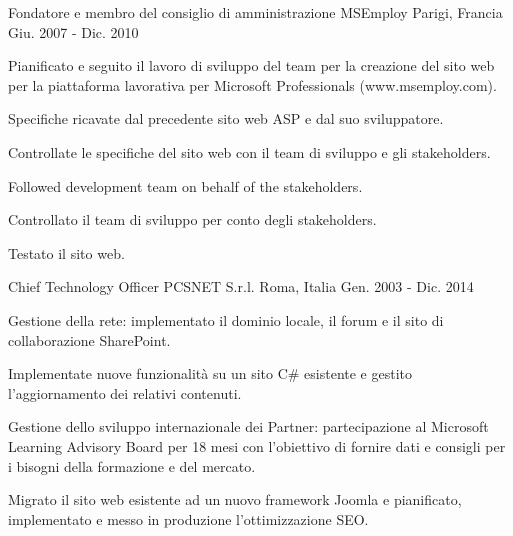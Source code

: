 \begin{cventries}
  \cventry
    {Fondatore e membro del consiglio di amministrazione} %
    {MSEmploy} %
    {Parigi, Francia} %
    {Giu. 2007 - Dic. 2010} %
    {
      \begin{cvitems} %
        \item {Pianificato e seguito il lavoro di sviluppo del team per la creazione del sito web per la piattaforma lavorativa per Microsoft Professionals (www.msemploy.com).}
        \item {Specifiche ricavate dal precedente sito web ASP e dal suo sviluppatore.}
        \item {Controllate le specifiche del sito web con il team di sviluppo e gli stakeholders.}
        \item {Followed development team on behalf of the stakeholders.}
        \item {Controllato il team di sviluppo per conto degli stakeholders.}
        \item {Testato il sito web.}
      \end{cvitems}
    }

  \cventry
    {Chief Technology Officer} %
    {PCSNET S.r.l.} %
    {Roma, Italia} %
    {Gen. 2003 - Dic. 2014} %
    {
      \begin{cvitems} %
        \item {Gestione della rete: implementato il dominio locale, il forum e il sito di collaborazione SharePoint.}
        \item {Implementate nuove funzionalità su un sito C\# esistente e gestito l'aggiornamento dei relativi contenuti.}
        \item {Gestione dello sviluppo internazionale dei Partner: partecipazione al Microsoft Learning Advisory Board per 18 mesi con l'obiettivo di fornire dati e consigli per i bisogni della formazione e del mercato.}
        \item {Migrato il sito web esistente ad un nuovo framework Joomla e pianificato, implementato e messo in produzione l'ottimizzazione SEO.}
      \end{cvitems}
    }


\end{cventries}
